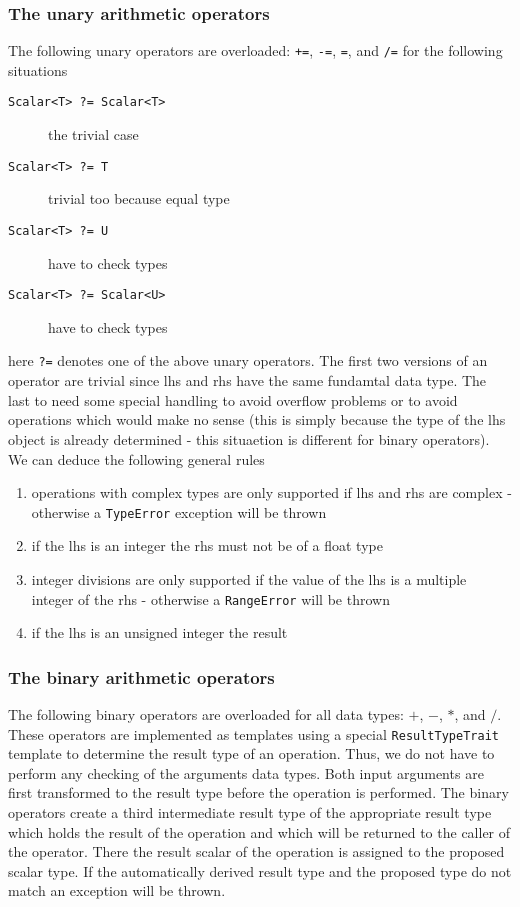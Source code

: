 \subsubsection{The unary arithmetic operators}
The following unary operators are overloaded: {\tt +=}, {\tt -=}, {\tt *=}, and
{\tt /=} for the following situations
\begin{description}
\item[{\tt Scalar<T> ?= Scalar<T>}] the trivial case 
\item[{\tt Scalar<T> ?= T}] trivial too because equal type
\item[{\tt Scalar<T> ?= U}] have to check types
\item[{\tt Scalar<T> ?= Scalar<U>}] have to check types
\end{description}
here {\tt ?=} denotes one of the above unary operators. The first two versions
of an operator are trivial since lhs and rhs have the same fundamtal data
type. The last to need some special handling to avoid overflow problems or 
to avoid operations which would make no sense (this is simply because the 
type of the lhs object is already determined - this situaetion is different 
for binary operators).
We can deduce the following general rules
\begin{enumerate}
  \item operations with complex types are only supported if lhs and rhs are
  complex - otherwise a {\tt TypeError} exception will be thrown
  \item if the lhs is an integer the rhs must not be of a float type
  \item integer divisions are only supported if the value of the lhs is a 
        multiple integer of the rhs - otherwise a {\tt RangeError} will be 
        thrown
  \item if the lhs is an unsigned integer the result 
\end{enumerate}


\subsubsection{The binary arithmetic operators}

The following binary operators are overloaded for all data types: $+$, $-$, $*$,
and $/$. These operators are implemented as templates using a special 
{\tt ResultTypeTrait} template to determine the result type of an operation. 
Thus, we do not have to perform any checking of the arguments 
data types. Both input arguments are first transformed to the result type 
before the operation is performed. 
The binary operators create a third intermediate result type of the 
appropriate result type which holds the result of the operation and which 
will be returned to the caller of the operator. There the result scalar of the 
operation is assigned to the proposed scalar type. If the automatically 
derived result type and the proposed type do not match an exception will be
thrown. 

